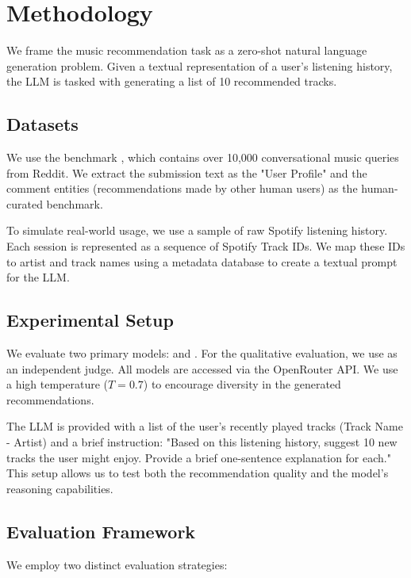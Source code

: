 \section{Methodology}

We frame the music recommendation task as a zero-shot natural language generation problem. Given a textual representation of a user's listening history, the LLM is tasked with generating a list of 10 recommended tracks.

\subsection{Datasets}

\para{\musicrs}
We use the \musicrs benchmark \cite{surana2025musicrs}, which contains over 10,000 conversational music queries from Reddit. We extract the submission text as the "User Profile" and the comment entities (recommendations made by other human users) as the human-curated benchmark.

\para{\spotifydata}
To simulate real-world usage, we use a sample of raw Spotify listening history. Each session is represented as a sequence of Spotify Track IDs. We map these IDs to artist and track names using a metadata database to create a textual prompt for the LLM.

\subsection{Experimental Setup}

We evaluate two primary models: \claudesonnet and \gptfourmini. For the qualitative evaluation, we use \gptfour as an independent judge. All models are accessed via the OpenRouter API. We use a high temperature ($T=0.7$) to encourage diversity in the generated recommendations.

The LLM is provided with a list of the user's recently played tracks (Track Name - Artist) and a brief instruction: "Based on this listening history, suggest 10 new tracks the user might enjoy. Provide a brief one-sentence explanation for each." This setup allows us to test both the recommendation quality and the model's reasoning capabilities.

\subsection{Evaluation Framework}

We employ two distinct evaluation strategies:

